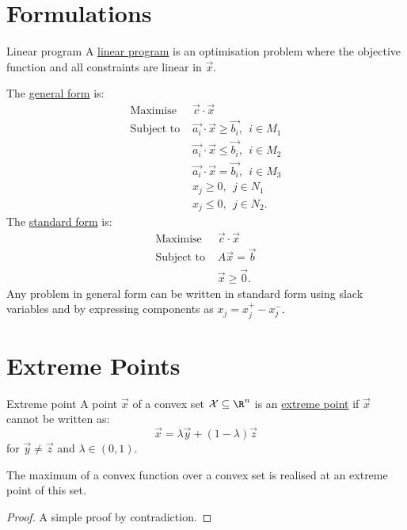 \documentclass[../Main.tex]{subfiles}
\begin{document}
\section{Formulations}
\begin{definition}{Linear program}
    A \underline{linear program} is an optimisation problem where the objective function and all constraints are linear in $\vec{x}$.
\end{definition}
The \underline{general form} is:
\begin{align*}
    \text{Maximise } & \vec{c} \cdot \vec{x} \\
    \text{Subject to } & \vec{a_i} \cdot \vec{x} \geq \vec{b_{i}},~~i \in M_1 \\
    & \vec{a_i} \cdot \vec{x} \leq \vec{b_{i}},~~i \in M_2 \\
    & \vec{a_i} \cdot \vec{x} = \vec{b_{i}},~~i \in M_3 \\
    & x_j \geq 0,~~j \in N_1 \\
    & x_j \leq 0,~~j \in N_2.
\end{align*}
The \underline{standard form} is:
\begin{align*}
    \text{Maximise } & \vec{c} \cdot \vec{x} \\
    \text{Subject to } & A\vec{x} = \vec{b} \\
    & \vec{x} \geq \vec{0}.
\end{align*}
Any problem in general form can be written in standard form using slack variables and by expressing components as $x_j = x_j^+ - x_j^-$.
\section{Extreme Points}
\begin{definition}{Extreme point}
    A point $\vec{x}$ of a convex set $\Xset \subseteq \R^n$ is an \underline{extreme point} if $\vec{x}$ cannot be written as:
    \begin{equation*}
        \vec{x} = \lambda \vec{y} + (1 - \lambda) \vec{z}
    \end{equation*}
    for $\vec{y} \neq \vec{z}$ and $\lambda \in (0, 1)$.
\end{definition}
\begin{theorem}
    The maximum of a convex function over a convex set is realised at an extreme point of this set.
    \label{thmMaxAtExtreme}
\end{theorem}
\begin{proof}
    A simple proof by contradiction.
\end{proof}
\end{document}
